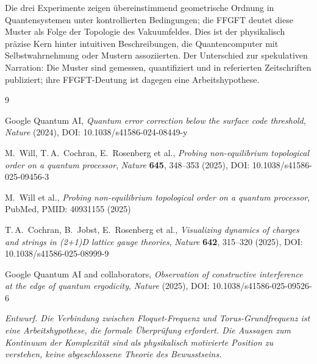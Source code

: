 Die drei Experimente zeigen übereinstimmend geometrische Ordnung in Quantensystemen
unter kontrollierten Bedingungen; die FFGFT deutet diese Muster als Folge der
Topologie des Vakuumfeldes. Dies ist der physikalisch präzise Kern hinter intuitiven
Beschreibungen, die Quantencomputer mit Selbstwahrnehmung oder Mustern assoziierten.
Der Unterschied zur spekulativen Narration: Die Muster sind gemessen, quantifiziert
und in referierten Zeitschriften publiziert; ihre FFGFT-Deutung ist dagegen eine
Arbeitshypothese.

\vspace{0.8cm}

\begin{thebibliography}{9}

Google Quantum AI,
\textit{Quantum error correction below the surface code threshold},
\textit{Nature} (2024), DOI: 10.1038/s41586-024-08449-y

M.~Will, T.\,A.~Cochran, E.~Rosenberg et al.,
\textit{Probing non-equilibrium topological order on a quantum processor},
\textit{Nature} \textbf{645}, 348--353 (2025),
DOI: 10.1038/s41586-025-09456-3

M.~Will et al.,
\textit{Probing non-equilibrium topological order on a quantum processor},
PubMed, PMID: 40931155 (2025)

T.\,A.~Cochran, B.~Jobst, E.~Rosenberg et al.,
\textit{Visualizing dynamics of charges and strings in (2+1)D lattice gauge theories},
\textit{Nature} \textbf{642}, 315--320 (2025),
DOI: 10.1038/s41586-025-08999-9

Google Quantum AI and collaborators,
\textit{Observation of constructive interference at the edge of quantum ergodicity},
\textit{Nature} (2025), DOI: 10.1038/s41586-025-09526-6

\end{thebibliography}

\vspace{0.5cm}
\noindent
\textit{Entwurf. Die Verbindung zwischen Floquet-Frequenz und Torus-Grundfrequenz
ist eine Arbeitshypothese, die formale Überprüfung erfordert. Die Aussagen zum
Kontinuum der Komplexität sind als physikalisch motivierte Position zu verstehen,
keine abgeschlossene Theorie des Bewusstseins.}
